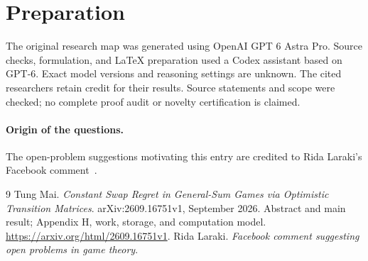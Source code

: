\documentclass[11pt]{article}
\begin{document}
\section*{Preparation}
The original research map was generated using OpenAI GPT 6 Astra Pro.
Source checks, formulation, and LaTeX preparation used a Codex assistant
based on GPT-6. Exact model versions and reasoning settings are unknown.
The cited researchers retain credit for their results. Source statements
and scope were checked; no complete proof audit or novelty certification
is claimed.
\paragraph{Origin of the questions.}
The open-problem suggestions motivating this entry are credited to
Rida Laraki's Facebook comment~\cite{laraki-facebook}.
\begin{thebibliography}{9}
Tung Mai.
\emph{Constant Swap Regret in General-Sum Games via Optimistic Transition Matrices}.
arXiv:2609.16751v1, September 2026.
Abstract and main result; Appendix H, work, storage, and computation model.
\url{https://arxiv.org/html/2609.16751v1}.
Rida Laraki.
\emph{Facebook comment suggesting open problems in game theory}.
\end{thebibliography}
\end{document}
